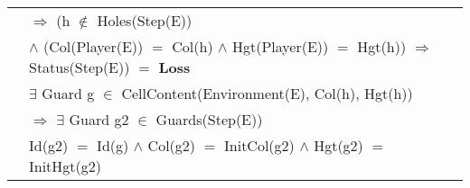 \documentclass[8pt]{article}
\begin{document}
{\begin{longtable}{rl}
  & \quad\quad $\Rightarrow$ (h $\notin$ \textrm{Holes(Step(E))}\\
  & \quad\quad\quad\quad $\land$ (\textrm{Col(Player(E))} $=$ \textrm{Col(h)} $\land$ \textrm{Hgt(Player(E))} $=$ \textrm{Hgt(h)}) $\Rightarrow$ \textrm{Status(Step(E))} $=$ \textbf{Loss}\\
  & \quad\quad\quad\quad $\exists$ \textrm{Guard} g $\in$ \textrm{CellContent(Environment(E), Col(h), Hgt(h))}\\
  & \quad\quad\quad\quad\quad\quad $\Rightarrow$ $\exists$ \textrm{Guard} g2 $\in$ \textrm{Guards(Step(E))}\\
  & \quad\quad\quad\quad\quad\quad\quad \textrm{Id(g2)} $=$ \textrm{Id(g)} $\land$ \textrm{Col(g2)} $=$ \textrm{InitCol(g2)} $\land$ \textrm{Hgt(g2)} $=$ \textrm{InitHgt(g2)}\\
\end{longtable}}
\end{document}
